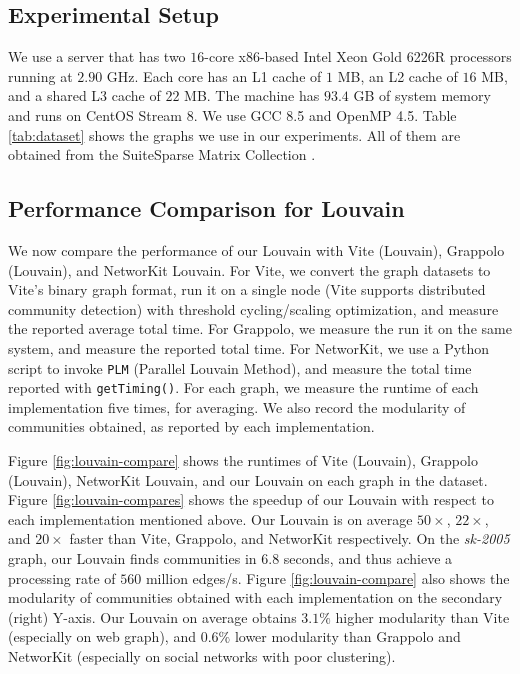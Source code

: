 \subsection{Experimental Setup}
\label{sec:setup}

We use a server that has two $16$-core x86-based Intel Xeon Gold 6226R processors running at $2.90$ GHz. Each core has an L1 cache of $1$ MB, an L2 cache of $16$ MB, and a shared L3 cache of $22$ MB. The machine has $93.4$ GB of system memory and runs on CentOS Stream 8. We use GCC 8.5 and OpenMP 4.5. Table \ref{tab:dataset} shows the graphs we use in our experiments. All of them are obtained from the SuiteSparse Matrix Collection \cite{suite19}.











\subsection{Performance Comparison for Louvain}

We now compare the performance of our Louvain with Vite (Louvain), Grappolo (Louvain), and NetworKit Louvain. For Vite, we convert the graph datasets to Vite's binary graph format, run it on a single node (Vite supports distributed community detection) with threshold cycling/scaling optimization, and measure the reported average total time. For Grappolo, we measure the run it on the same system, and measure the reported total time. For NetworKit, we use a Python script to invoke \texttt{PLM} (Parallel Louvain Method), and measure the total time reported with \texttt{getTiming()}. For each graph, we measure the runtime of each implementation five times, for averaging. We also record the modularity of communities obtained, as reported by each implementation.

Figure \ref{fig:louvain-compare} shows the runtimes of Vite (Louvain), Grappolo (Louvain), NetworKit Louvain, and our Louvain on each graph in the dataset. Figure \ref{fig:louvain-compares} shows the speedup of our Louvain with respect to each implementation mentioned above. Our Louvain is on average $50\times$, $22\times$, and $20\times$ faster than Vite, Grappolo, and NetworKit respectively. On the \textit{sk-2005} graph, our Louvain finds communities in $6.8$ seconds, and thus achieve a processing rate of $560$ million edges/s. Figure \ref{fig:louvain-compare} also shows the modularity of communities obtained with each implementation on the secondary (right) Y-axis. Our Louvain on average obtains $3.1\%$ higher modularity than Vite (especially on web graph), and $0.6\%$ lower modularity than Grappolo and NetworKit (especially on social networks with poor clustering).




